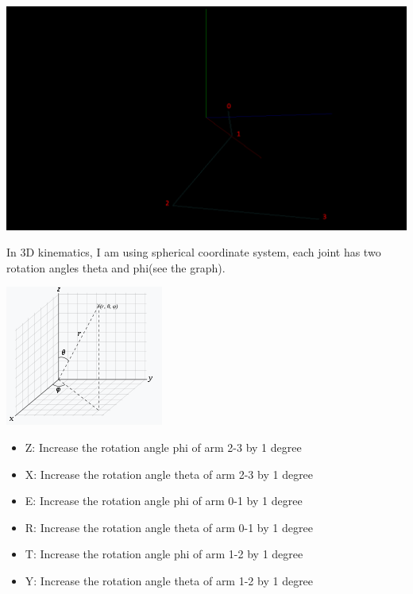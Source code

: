 \documentclass[a4paper, 11pt]{article}
\begin{document}
        \begin{center}
            \includegraphics[width = \textwidth]{Capture5.PNG}
        \end{center}
        In 3D kinematics, I am using spherical coordinate system, each joint has two rotation angles theta and phi(see the graph).
        \begin{center}
            \includegraphics[width = .6\textwidth]{Capture4.PNG}
        \end{center}
        \begin{itemize}
            \item Z: Increase the rotation angle phi of arm 2-3 by 1 degree
            \item X: Increase the rotation angle theta of arm 2-3 by 1 degree
            \item E: Increase the rotation angle phi of arm 0-1 by 1 degree
            \item R: Increase the rotation angle theta of arm 0-1 by 1 degree
            \item T: Increase the rotation angle phi of arm 1-2 by 1 degree
            \item Y: Increase the rotation angle theta of arm 1-2 by 1 degree
        \end{itemize}
\end{document}
